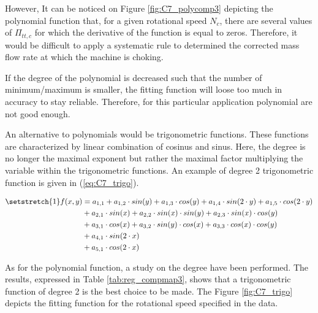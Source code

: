However, It can be noticed on Figure \ref{fig:C7_polycomp3} depicting the polynomial function that, for a given rotational speed $N_c$, there are several values of $\Pi_{tt,c}$ for which the derivative of the function is equal to zeros. Therefore, it would be difficult to apply a systematic rule to determined the corrected mass flow rate at which the machine is choking. 

If the degree of the polynomial is decreased such that the number of minimum/maximum is smaller, the fitting function will loose too much in accuracy to stay reliable. Therefore, for this particular application polynomial are not good enough.

An alternative to polynomials would be trigonometric functions. These functions are characterized by linear combination of cosinus and sinus. Here, the degree is no longer the maximal exponent but rather the maximal factor multiplying the variable within the trigonometric functions. An example of degree 2 trigonometric function is given in (\ref{eq:C7_trigo}).

\begin{align}
\setstretch{1}
    f(x,y) &= a_{1,1} + a_{1,2}\cdot sin(y) + a_{1,3}\cdot cos(y) + a_{1,4}\cdot sin(2\cdot y) + a_{1,5}\cdot cos(2\cdot y)\nonumber\\
           &+ a_{2,1}\cdot sin(x) + a_{2,2}\cdot sin(x)\cdot sin(y) + a_{2,3}\cdot sin(x)\cdot cos(y)\nonumber\\
           &+ a_{3,1}\cdot cos(x) + a_{3,2}\cdot sin(y)\cdot cos(x) + a_{3,3}\cdot cos(x)\cdot cos(y)\label{eq:C7_trigo}\\
           &+ a_{4,1}\cdot sin(2\cdot x)\nonumber\\
           &+ a_{5,1}\cdot cos(2\cdot x) \nonumber
\end{align}

As for the polynomial function, a study on the degree have been performed. The results, expressed in Table \ref{tab:reg_compmap3}, shows that a trigonometric function of degree 2 is the best choice to be made. The Figure \ref{fig:C7_trigo} depicts the fitting function for the rotational speed specified in the data.


